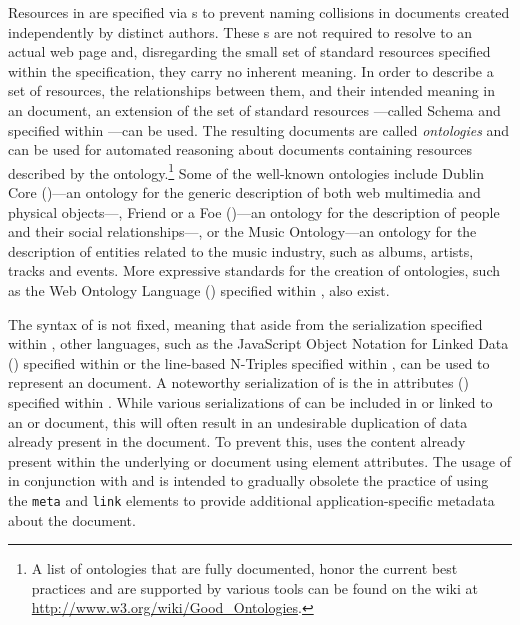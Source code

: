 \documentclass{book}
\begin{document}
        Resources in  are specified via s to prevent
        naming collisions in  documents created independently by
        distinct authors. These s are not required to resolve to an
        actual web page and, disregarding the small set of standard resources
        specified within the  specification, they carry no
        inherent meaning.  In order to describe a set of resources, the
        relationships between them, and their intended meaning in an
         document, an extension of the set of standard resources%
        ---called  Schema and specified within
        \cite{brickley04}---can be used.  The resulting documents are called
        \emph{ontologies} and can be used for automated reasoning about
         documents containing resources described by the
        ontology.\footnote{
          A list of ontologies that are fully documented, honor the current best
          practices and are supported by various tools can be found on the
           wiki at \url{http://www.w3.org/wiki/Good_Ontologies}.
        } Some of the well-known ontologies include Dublin
        Core ()---an ontology for the generic description of both
        web multimedia and physical objects---, Friend or a Foe
        ()---an ontology for the description of people and their
        social relationships---, or the Music Ontology---an ontology for the
        description of entities related to the music industry, such as albums,
        artists, tracks and events. More expressive standards for the creation
        of ontologies, such as the Web Ontology Language ()
        specified within \cite{mcguinness04}, also exist.

        The syntax of  is not fixed, meaning that aside from the
         serialization specified within \cite{lassira99}, other
        languages, such as the JavaScript Object Notation for Linked Data
        () specified within \cite{sporny14} or the line-based
        N-Triples specified within \cite{beckett14}, can be used to represent an
         document. A noteworthy serialization of  is
        the  in attributes () specified within
        \cite{adida08}. While various serializations of  can be
        included in or linked to an  or  document,
        this will often result in an undesirable duplication of data already
        present in the document. To prevent this,  uses the
        content already present within the underlying  or
         document using element attributes. The usage of
         in conjunction with  and  is
        intended to gradually obsolete the practice of using the \texttt{meta}
        and \texttt{link} elements to provide additional application-specific
        metadata about the document.
\end{document}
